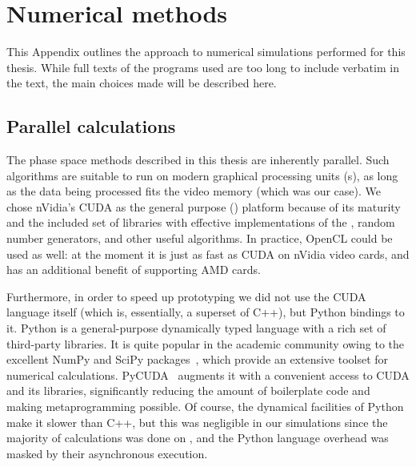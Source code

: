 \chapter{Numerical methods}
\label{cha:appendix:numerical}

This Appendix outlines the approach to numerical simulations performed for this thesis.
While full texts of the programs used are too long to include verbatim in the text, the main choices made will be described here.


\section{Parallel calculations}

The phase space methods described in this thesis are inherently parallel.
Such algorithms are suitable to run on modern graphical processing units (s), as long as the data being processed fits the video memory (which was our case).
We chose nVidia's CUDA as the general purpose  () platform because of its maturity and the included set of libraries with effective implementations of the , random number generators, and other useful algorithms.
In practice, OpenCL could be used as well: at the moment it is just as fast as CUDA on nVidia video cards, and has an additional benefit of supporting AMD cards.

Furthermore, in order to speed up prototyping we did not use the CUDA language itself (which is, essentially, a superset of C++), but Python bindings to it.
Python is a general-purpose dynamically typed language with a rich set of third-party libraries.
It is quite popular in the academic community owing to the excellent NumPy and SciPy packages~\cite{Oliphant2007}, which provide an extensive toolset for numerical calculations.
PyCUDA~\cite{Klockner2012} augments it with a convenient access to CUDA and its libraries, significantly reducing the amount of boilerplate code and making metaprogramming possible.
Of course, the dynamical facilities of Python make it slower than C++, but this was negligible in our simulations since the majority of calculations was done on , and the Python language overhead was masked by their asynchronous execution.


